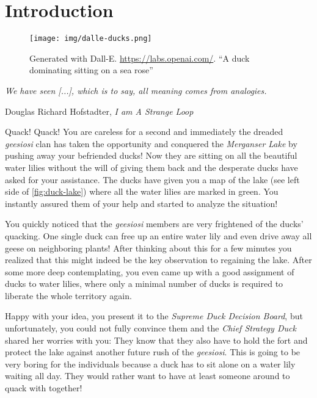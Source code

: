 \chapter{Introduction}\label{ch:introduction}

\vspace*{-50pt}

\begin{figure}[ht]
        \texttt{[image: img/dalle-ducks.png]}
        \captionsetup{textformat=empty,labelformat=blank}
        \caption{Generated with Dall-E. \url{https://labs.openai.com/}. ``A duck dominating sitting on a sea rose''}
\end{figure}

\epigraph{\itshape We have seen [...], which is to say, all meaning comes from analogies.}{Douglas Richard Hofstadter, \textit{I am A Strange Loop}}

Quack! Quack! You are careless for a second and immediately the dreaded \textit{geesiosi} clan has taken the opportunity and conquered the \textit{Merganser Lake} by pushing away your befriended ducks!
Now they are sitting on all the beautiful water lilies without the will of giving them back and the desperate ducks have asked for your assistance.
The ducks have given you a map of the lake (see left side of \cref{fig:duck-lake}) where all the water lilies are marked in green.
You instantly assured them of your help and started to analyze the situation!

You quickly noticed that the \textit{geesiosi} members are very frightened of the ducks' quacking. 
One single duck can free up an entire water lily and even drive away all geese on neighboring plants! After thinking about this for a few minutes you realized that this might indeed be the key observation to regaining the lake. 
After some more deep contemplating, you even came up with a good assignment of ducks to water lilies, where only a minimal number of ducks is required to liberate the whole territory again.

Happy with your idea, you present it to the \textit{Supreme Duck Decision Board}, but unfortunately, you could not fully convince them and the \textit{Chief Strategy Duck} shared her worries with you: 
They know that they also have to hold the fort and protect the lake against another future rush of the \textit{geesiosi}.
This is going to be very boring for the individuals because a duck has to sit alone on a water lily waiting all day. They would rather want to have at least someone around to quack with together!

